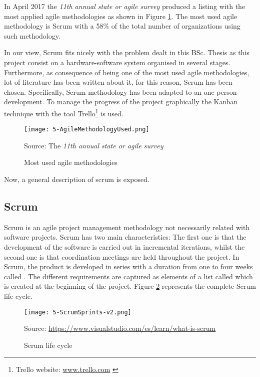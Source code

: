 In April 2017 the \emph{11th annual state or agile survey} \cite{AnualStateAgile} produced a listing with the most applied agile methodologies as shown in Figure \ref{fig:5-AgileMethodologyUsed}. The most used agile methodology is Scrum with a 58\% of the total number of organizations using such methodology.

In our view, Scrum fits nicely with the problem dealt in this \ac{BSc.} Thesis as this project consist on a hardware-software system organised in several stages. Furthermore, as consequence of being one of the most used agile methodologies, lot of literature has been written about it, for this reason, Scrum has been chosen. Specifically, Scrum methodology \cite{ScrumGuide} has been adapted to an one-person development. To manage the progress of the project graphically the Kanban technique with the tool Trello\footnote{Trello website: \url{www.trello.com} \label{footnote-1}} is used.

\begin{figure}[!h]
	\begin{center}
		\texttt{[image: 5-AgileMethodologyUsed.png]}
		\caption{Most used agile methodologies}{Source: The \emph{11th annual state or agile survey}}
		\label{fig:5-AgileMethodologyUsed}
	\end{center}
\end{figure}

Now, a general description of scrum is exposed.


\subsection{Scrum}

Scrum \cite{ScrumGuide} is an agile project management methodology not necessarily related with software projects. Scrum has two main characteristics: The first one is that the development of the software is carried out in incremental iterations, whilst the second one is that coordination meetings are held throughout the project.
In Scrum, the product is developed in series with a duration from one to four weeks called . The different requirements are captured as elements of a list called  which is created at the beginning of the project. Figure \ref{fig:5-ScrumSprints} represents the complete Scrum life cycle.

\begin{figure}[!h]
	\begin{center}
		\texttt{[image: 5-ScrumSprints-v2.png]}	
		\caption{Scrum life cycle}{Source: \url{https://www.visualstudio.com/es/learn/what-is-scrum}}
		\label{fig:5-ScrumSprints}
	\end{center}
\end{figure}


